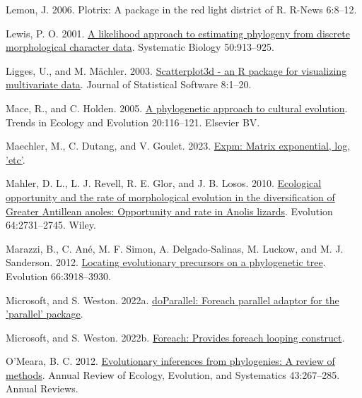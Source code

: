\documentclass[fleqn,10pt,lineno]{wlpeerj} %
\newlength{\cslhangindent}
\newenvironment{CSLReferences}[2] %
 {\begin{list}{}{%
  \setlength{\itemindent}{0pt}
  \setlength{\leftmargin}{0pt}
  \setlength{\parsep}{0pt}
  \ifodd #1
   \setlength{\leftmargin}{\cslhangindent}
   \setlength{\itemindent}{-1\cslhangindent}
  \fi
  \setlength{\itemsep}{#2\baselineskip}}}
 {\end{list}}
\begin{document}
\begin{CSLReferences}{1}{0}
Lemon, J. 2006. Plotrix: A package in the red light district of {R}. R-News 6:8--12.

Lewis, P. O. 2001. \href{https://doi.org/10.1080/106351501753462876}{A likelihood approach to estimating phylogeny from discrete morphological character data}. Systematic Biology 50:913--925.

Ligges, U., and M. Mächler. 2003. \href{https://doi.org/10.18637/jss.v008.i11}{Scatterplot3d - an {R} package for visualizing multivariate data}. Journal of Statistical Software 8:1--20.

Mace, R., and C. Holden. 2005. \href{https://doi.org/10.1016/j.tree.2004.12.002}{A phylogenetic approach to cultural evolution}. Trends in Ecology and Evolution 20:116--121. Elsevier BV.

Maechler, M., C. Dutang, and V. Goulet. 2023. \href{https://CRAN.R-project.org/package=expm}{Expm: Matrix exponential, log, 'etc'}.

Mahler, D. L., L. J. Revell, R. E. Glor, and J. B. Losos. 2010. \href{https://doi.org/10.1111/j.1558-5646.2010.01026.x}{Ecological opportunity and the rate of morphological evolution in the diversification of {G}reater {A}ntillean anoles: Opportunity and rate in {A}nolis lizards}. Evolution 64:2731--2745. Wiley.

Marazzi, B., C. Ané, M. F. Simon, A. Delgado-Salinas, M. Luckow, and M. J. Sanderson. 2012. \href{https://doi.org/10.1111/j.1558-5646.2012.01720.x}{Locating evolutionary precursors on a phylogenetic tree}. Evolution 66:3918--3930.

Microsoft, and S. Weston. 2022a. \href{https://CRAN.R-project.org/package=doParallel}{doParallel: Foreach parallel adaptor for the 'parallel' package}.

Microsoft, and S. Weston. 2022b. \href{https://CRAN.R-project.org/package=foreach}{Foreach: Provides foreach looping construct}.

O'Meara, B. C. 2012. \href{https://doi.org/10.1146/annurev-ecolsys-110411-160331}{Evolutionary inferences from phylogenies: A review of methods}. Annual Review of Ecology, Evolution, and Systematics 43:267--285. Annual Reviews.


\end{CSLReferences}
\end{document}
